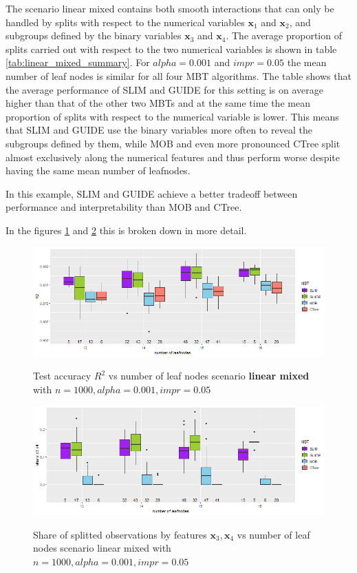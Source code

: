The scenario linear mixed contains both smooth interactions that can only be handled by splits with respect to the numerical variables $\textbf{x}_1$ and $\textbf{x}_2$, and subgroups defined by the binary variables $\textbf{x}_3$ and $\textbf{x}_4$. 
The average proportion of splits carried out with respect to the two numerical variables is shown in table \ref{tab:linear_mixed_summary}.
For $alpha = 0.001$ and $impr = 0.05$ the mean number of leaf nodes is similar for all four MBT algorithms. The table shows that the average performance of SLIM and GUIDE for this setting is on average higher than that of the other two MBTs and at the same time the mean proportion of splits with respect to the numerical variable is lower.  This means that SLIM and GUIDE use the binary variables more often to reveal the subgroups defined by them, while MOB and even more pronounced CTree split almost exclusively along the numerical features and thus perform worse despite having the same mean number of leafnodes. 

In this example, SLIM and GUIDE achieve a better tradeoff between performance and interpretability than MOB and CTree.


In the figures \ref{fig:lm_1000_standalone_r2_test}  and \ref{fig:lm_1000_standalone_share_x3x4} this is broken down in more detail.


\begin{figure}[!htb]
\caption{Test accuracy $R^2$ vs number of leaf nodes scenario \textbf{linear mixed} with $n=1000, alpha = 0.001, impr = 0.05$}
    \includegraphics[width=16cm]{Figures/simulations/batchtools/basic_scenarios/linear_mixed/lm_1000_standalone_r2_test.png}
    \label{fig:lm_1000_standalone_r2_test}
\end{figure} 


\begin{figure}[!htb]
\caption{Share of splitted observations by features $\textbf{x}_3, \textbf{x}_4$ vs number of leaf nodes scenario linear mixed with $n=1000, alpha = 0.001, impr = 0.05$}
    \includegraphics[width=16cm]{Figures/simulations/batchtools/basic_scenarios/linear_mixed/lm_1000_standalone_share_x3x4.png}
    \label{fig:lm_1000_standalone_share_x3x4}
\end{figure} 




